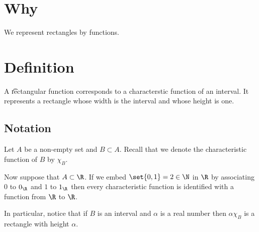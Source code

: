 

\section*{Why}

We represent rectangles by functions.

\section*{Definition}

A \t{rectangular function} corresponds to a characterstic function of an interval.
It represents a rectangle whose width is the interval and whose height is one.
%  


\subsection*{Notation}

Let $A$ be a non-empty set and $B \subset A$.
Recall that we denote the characteristic function of $B$ by $\chi _{B}$.

Now suppose that $A \subset \R $.
If we embed $\set{0, 1} = 2 \in \N  $ in $\R $ by associating $0$ to $0_{\R }$ and $1$ to $1_{\R }$ then every characteristic function is identified with a function from $\R $ to $\R $.

In particular, notice that if $B$ is an interval and $\alpha $ is a real number then $\alpha  \chi _{B}$ is a rectangle with height $\alpha $.

\blankpage
